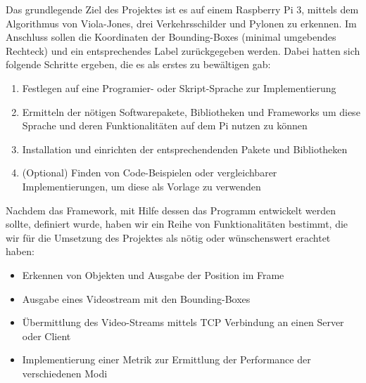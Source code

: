 Das grundlegende Ziel des Projektes ist es auf einem Raspberry Pi 3, mittels dem Algorithmus von Viola-Jones, drei Verkehrsschilder und Pylonen zu erkennen. Im Anschluss sollen die Koordinaten der Bounding-Boxes (minimal umgebendes Rechteck) und ein entsprechendes Label zurückgegeben werden. Dabei hatten sich folgende Schritte ergeben, die es als erstes zu bewältigen gab:

\begin{enumerate}
\item Festlegen auf eine Programier- oder Skript-Sprache zur Implementierung 
\item Ermitteln der nötigen Softwarepakete, Bibliotheken und Frameworks um diese Sprache und deren Funktionalitäten auf dem Pi nutzen zu können
\item Installation und einrichten der entsprechendenden Pakete und Bibliotheken
\item (Optional) Finden von Code-Beispielen oder vergleichbarer Implementierungen, um diese als Vorlage zu verwenden
\end{enumerate}

Nachdem das Framework, mit Hilfe dessen das Programm entwickelt werden sollte, definiert wurde, haben wir ein Reihe von Funktionalitäten bestimmt, die wir für die Umsetzung des Projektes als nötig oder wünschenswert erachtet haben: 

\begin{itemize}
\item Erkennen von Objekten und Ausgabe der Position im Frame
\item Ausgabe eines Videostream mit den Bounding-Boxes
\item Übermittlung des Video-Streams mittels TCP Verbindung an einen Server oder Client
\item Implementierung einer Metrik zur Ermittlung der Performance der verschiedenen Modi
\end{itemize}



